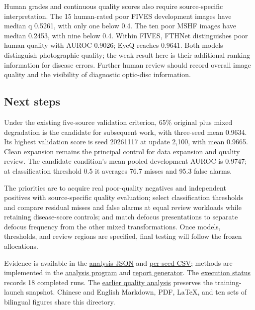 \documentclass[
  10pt,
]{article}
\begin{document}
Human grades and continuous quality scores also require source-specific
interpretation. The 15 human-rated poor FIVES development images have
median q 0.5261, with only one below 0.4. The ten poor MSHF images have
median 0.2453, with nine below 0.4. Within FIVES, FTHNet distinguishes
poor human quality with AUROC 0.9026; EyeQ reaches 0.9641. Both models
distinguish photographic quality; the weak result here is their
additional ranking information for disease errors. Further human review
should record overall image quality and the visibility of diagnostic
optic-disc information.

\subsection{Next steps}\label{next-steps}

Under the existing five-source validation criterion, 65\% original plus
mixed degradation is the candidate for subsequent work, with three-seed
mean 0.9634. Its highest validation score is seed 20261117 at update
2,100, with mean 0.9665. Clean expansion remains the principal control
for data expansion and quality review. The candidate condition's mean
pooled development AUROC is 0.9747; at classification threshold 0.5 it
averages 76.7 misses and 95.3 false alarms.

The priorities are to acquire real poor-quality negatives and
independent positives with source-specific quality evaluation; select
classification thresholds and compare residual misses and false alarms
at equal review workloads while retaining disease-score controls; and
match defocus presentations to separate defocus frequency from the other
mixed transformations. Once models, thresholds, and review regions are
specified, final testing will follow the frozen allocations.

Evidence is available in the \href{completed-analysis.json}{analysis
JSON} and \href{per-seed-results.csv}{per-seed CSV}; methods are
implemented in the
\href{../../../../tools/analyze_completed_followup_20261115.py}{analysis
program} and
\href{../../../../tools/report_completed_followup_20261115.py}{report
generator}. The
\href{../../../../runs/followup_20261115/pipeline/status.json}{execution
status} records 18 completed runs. The
\href{../quality-and-training.en.md}{earlier quality analysis} preserves
the training-launch snapshot. Chinese and English Markdown, PDF, LaTeX,
and ten sets of bilingual figures share this directory.
\end{document}
